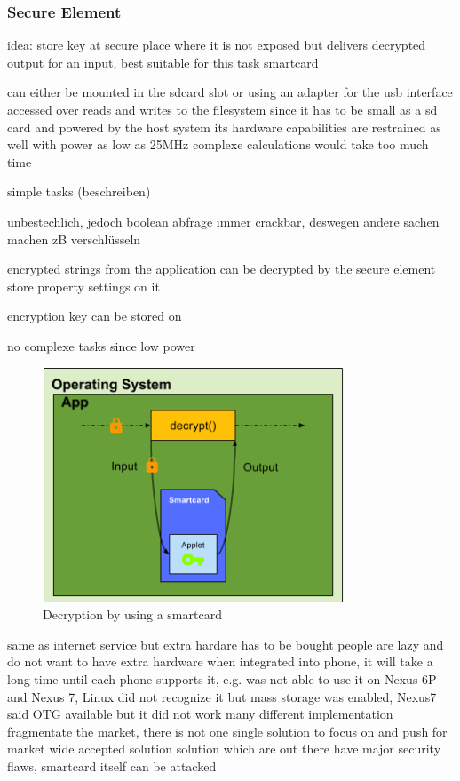 \subsubsection{Secure Element} \label{section:counter-replace-encryption-key-local}

idea: store key at secure place where it is not exposed but delivers decrypted output for an input, best suitable for this task smartcard


can either be mounted in the sdcard slot or using an adapter for the usb interface
accessed over reads and writes to the filesystem
since it has to be small as a sd card and powered by the host system its hardware capabilities are restrained as well \cite{stSe} with power as low as 25MHz complexe calculations would take too much time

simple tasks (beschreiben)

unbestechlich, jedoch boolean abfrage immer crackbar, deswegen andere sachen machen zB verschlüsseln

encrypted strings from the application can be decrypted by the secure element
store property settings on it

encryption key can be stored on

no complexe tasks since low power

\begin{figure}[h]
    \centering
    \includegraphics[width=0.8\textwidth]{data/encryptionKeySmart.png}
    \caption{Decryption by using a smartcard}
    \label{fig:encryptionKeySmart}
\end{figure}


same as internet service but extra hardare has to be bought
people are lazy and do not want to have extra hardware
when integrated into phone, it will take a long time until each phone supports it, e.g. was not able to use it on Nexus 6P and Nexus 7, Linux did not recognize it but mass storage was enabled, Nexus7 said OTG available but it did not work
many different implementation fragmentate the market, there is not one single solution to focus on and push for market wide accepted solution
solution which are out there have major security flaws, smartcard itself can be attacked

